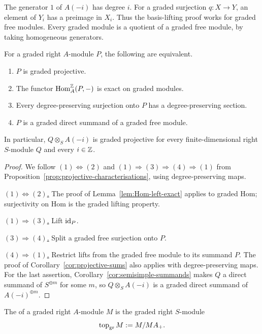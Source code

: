 The generator $1$ of $A(-i)$ has degree $i$.
For a graded surjection $q:X\to Y$, an element of $Y_i$ has a preimage in $X_i$.
Thus the basis-lifting proof works for graded free modules.
Every graded module is a quotient of a graded free module, by taking homogeneous generators.
\begin{corollary}\label{cor:graded-projective-characterisations}
For a graded right $A$-module $P$, the following are equivalent.
\begin{enumerate}
\item $P$ is graded projective.
\item The functor $\operatorname{Hom}\nolimits_A^{\mathbb{Z}}(P,-)$ is exact on graded modules.
\item Every degree-preserving surjection onto $P$ has a degree-preserving section.
\item $P$ is a graded direct summand of a graded free module.
\end{enumerate}
In particular, $Q\otimes_S A(-i)$ is graded projective for every finite-dimensional right $S$-module $Q$ and every $i\in\mathbb{Z}$.
\end{corollary}

\begin{proof}
We follow $(1)\Leftrightarrow(2)$ and $(1)\Rightarrow(3)\Rightarrow(4)\Rightarrow(1)$ from Proposition~\ref{prop:projective-characterisations}, using degree-preserving maps.

\underline{$(1)\Leftrightarrow(2)$.} The proof of Lemma~\ref{lem:Hom-left-exact} applies to graded Hom; surjectivity on Hom is the graded lifting property.

\underline{$(1)\Rightarrow(3)$.} Lift $\operatorname{id}_P$.

\underline{$(3)\Rightarrow(4)$.} Split a graded free surjection onto $P$.

\underline{$(4)\Rightarrow(1)$.} Restrict lifts from the graded free module to its summand $P$.
The proof of Corollary~\ref{cor:projective-sums} also applies with degree-preserving maps.
For the last assertion, Corollary~\ref{cor:semisimple-summands} makes $Q$ a direct summand of $S^{\oplus m}$ for some $m$, so $Q\otimes_S A(-i)$ is a graded direct summand of $A(-i)^{\oplus m}$.
\end{proof}

\begin{definition}\label{not:graded-top}
The  of a graded right $A$-module $M$ is the graded right $S$-module
\[
\operatorname{top}\nolimits_{\mathrm{gr}} M:=M/MA_+.
\]
\end{definition}

